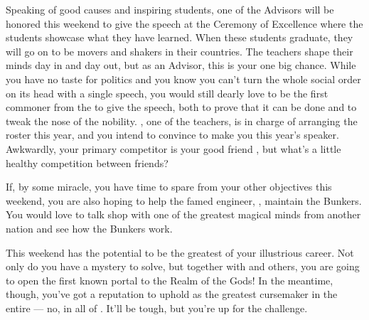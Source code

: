 \documentclass[char]{GL2020}
\begin{document}
Speaking of good causes and inspiring students, one of the Advisors will be honored this weekend to give the speech at the Ceremony of Excellence where the students showcase what they have learned. When these students graduate, they will go on to be movers and shakers in their countries. The teachers shape their minds day in and day out, but as an Advisor, this is your one big chance. While you have no taste for politics and you know you can't turn the whole social order on its head with a single speech, you would still dearly love to be the first commoner from the \pFarm{} to give the speech, both to prove that it can be done and to tweak the nose of the nobility. \cMusic{\full}, one of the teachers, is in charge of arranging the roster this year, and you intend to convince \cMusic{\them} to make you this year's speaker. Awkwardly, your primary competitor is your good friend \cHedonist{}, but what's a little healthy competition between friends?

If, by some miracle, you have time to spare from your other objectives this weekend, you are also hoping to help the famed \pShippie{} engineer, \cBunker{}, maintain the Bunkers. You would love to talk shop with one of the greatest magical minds from another nation and see how the Bunkers work.

This weekend has the potential to be the greatest of your illustrious career. Not only do you have a mystery to solve, but together with \cFlowPriest{} and others, you are going to open the first known portal to the Realm of the Gods! In the meantime, though, you've got a reputation to uphold as the greatest cursemaker in the entire \pFarm{} — no, in all of \pEarth{}. It'll be tough, but you're up for the challenge.
\end{document}
